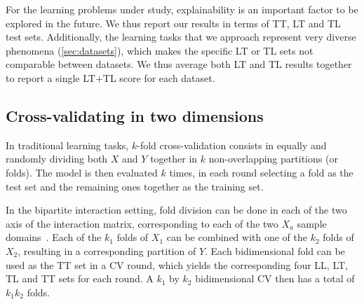 
For the learning problems under study, explainability is an important factor to be explored in the future. We thus report our results in terms of TT, LT and TL test sets. Additionally, the learning tasks that we approach represent very diverse phenomena (\autoref{sec:datasets}), which makes the specific LT or TL sets not comparable between datasets. We thus average both LT and TL results together to report a single LT+TL score for each dataset.




\subsection{Cross-validating in two dimensions}
\label{sec:cross_validation}

In traditional learning tasks, $k$-fold cross-validation consists in equally and randomly dividing both $X$ and $Y$ together in $k$ non-overlapping partitions (or folds). The model is then evaluated $k$ times, in each round selecting a fold as the test set and the remaining ones together as the training set.

In the bipartite interaction setting, fold division can be done in each of the two axis of the interaction matrix, corresponding to each of the two $X_a$ sample domains~\cite{vert2008reconstruction,pahikkala2015more}. Each of the $k_1$ folds of $X_1$ can be combined with one of the $k_2$ folds of $X_2$, resulting in a corresponding partition of $Y$. Each bidimensional fold can be used as the TT set in a CV round, which yields the corresponding four LL, LT, TL and TT sets for each round. A $k_1$ by $k_2$ bidimensional CV then has a total of $k_1k_2$ folds.

